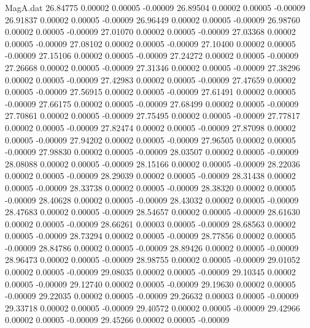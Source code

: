 \begin{filecontents}{MagA.dat}
  26.84775    0.00002    0.00005   -0.00009
  26.89504    0.00002    0.00005   -0.00009
  26.91837    0.00002    0.00005   -0.00009
  26.96449    0.00002    0.00005   -0.00009
  26.98760    0.00002    0.00005   -0.00009
  27.01070    0.00002    0.00005   -0.00009
  27.03368    0.00002    0.00005   -0.00009
  27.08102    0.00002    0.00005   -0.00009
  27.10400    0.00002    0.00005   -0.00009
  27.15106    0.00002    0.00005   -0.00009
  27.24272    0.00002    0.00005   -0.00009
  27.26668    0.00002    0.00005   -0.00009
  27.31346    0.00002    0.00005   -0.00009
  27.38296    0.00002    0.00005   -0.00009
  27.42983    0.00002    0.00005   -0.00009
  27.47659    0.00002    0.00005   -0.00009
  27.56915    0.00002    0.00005   -0.00009
  27.61491    0.00002    0.00005   -0.00009
  27.66175    0.00002    0.00005   -0.00009
  27.68499    0.00002    0.00005   -0.00009
  27.70861    0.00002    0.00005   -0.00009
  27.75495    0.00002    0.00005   -0.00009
  27.77817    0.00002    0.00005   -0.00009
  27.82474    0.00002    0.00005   -0.00009
  27.87098    0.00002    0.00005   -0.00009
  27.94202    0.00002    0.00005   -0.00009
  27.96505    0.00002    0.00005   -0.00009
  27.98830    0.00002    0.00005   -0.00009
  28.03507    0.00002    0.00005   -0.00009
  28.08088    0.00002    0.00005   -0.00009
  28.15166    0.00002    0.00005   -0.00009
  28.22036    0.00002    0.00005   -0.00009
  28.29039    0.00002    0.00005   -0.00009
  28.31438    0.00002    0.00005   -0.00009
  28.33738    0.00002    0.00005   -0.00009
  28.38320    0.00002    0.00005   -0.00009
  28.40628    0.00002    0.00005   -0.00009
  28.43032    0.00002    0.00005   -0.00009
  28.47683    0.00002    0.00005   -0.00009
  28.54657    0.00002    0.00005   -0.00009
  28.61630    0.00002    0.00005   -0.00009
  28.66261    0.00003    0.00005   -0.00009
  28.68563    0.00002    0.00005   -0.00009
  28.73294    0.00002    0.00005   -0.00009
  28.77856    0.00002    0.00005   -0.00009
  28.84786    0.00002    0.00005   -0.00009
  28.89426    0.00002    0.00005   -0.00009
  28.96473    0.00002    0.00005   -0.00009
  28.98755    0.00002    0.00005   -0.00009
  29.01052    0.00002    0.00005   -0.00009
  29.08035    0.00002    0.00005   -0.00009
  29.10345    0.00002    0.00005   -0.00009
  29.12740    0.00002    0.00005   -0.00009
  29.19630    0.00002    0.00005   -0.00009
  29.22035    0.00002    0.00005   -0.00009
  29.26632    0.00003    0.00005   -0.00009
  29.33718    0.00002    0.00005   -0.00009
  29.40572    0.00002    0.00005   -0.00009
  29.42966    0.00002    0.00005   -0.00009
  29.45266    0.00002    0.00005   -0.00009

\end{filecontents}
